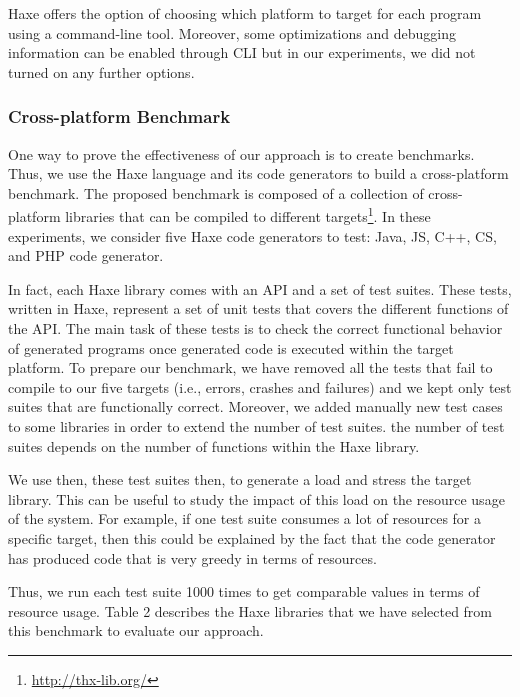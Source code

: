 Haxe offers the option of choosing which platform to target for each program using a command-line tool. Moreover, some optimizations and debugging information can be enabled through CLI but in our experiments, we did not turned on any further options. 

\subsubsection{Cross-platform Benchmark}
One way to prove the effectiveness of our approach is to create benchmarks. Thus, we use the Haxe language and its code generators to build a cross-platform benchmark. The proposed benchmark is composed of a collection of cross-platform libraries that can be compiled to different targets\footnote{\url{http://thx-lib.org/}}. In these experiments, we consider five Haxe code generators to test: Java, JS, C++, CS, and PHP code generator. 

In fact, each Haxe library comes with an API and a set of test suites. These tests, written in Haxe, represent a set of unit tests that covers the different functions of the API. The main task of these tests is to check the correct functional behavior of generated programs once generated code is executed within the target platform. To prepare our benchmark, we have removed all the tests that fail to compile to our five targets (i.e., errors, crashes and failures) and we kept only test suites that are functionally correct. Moreover, we added manually new test cases to some libraries in order to extend the number of test suites. the number of test suites depends on the number of functions within the Haxe library.

We use then, these test suites then, to generate a load and stress the target library. This can be useful to study the impact of this load on the resource usage of the system. For example, if one test suite consumes a lot of resources for a specific target, then this could be explained by the fact that the code generator has produced code that is very greedy in terms of resources.

Thus, we run each test suite 1000 times to get comparable values in terms of resource usage.
Table 2 describes the Haxe libraries that we have selected from this benchmark to evaluate our
approach.

